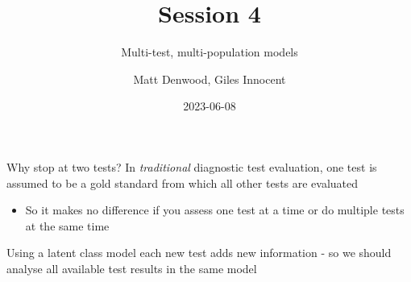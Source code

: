 \documentclass[
  ignorenonframetext,
  aspectratio=169,
]{beamer}
\title{Session 4}
\subtitle{Multi-test, multi-population models}
\author{Matt Denwood, Giles Innocent}
\date{2023-06-08}
\providecommand{\tightlist}{%
  \setlength{\itemsep}{0pt}\setlength{\parskip}{0pt}}
\begin{document}
\frame{\titlepage}

\begin{frame}{Why stop at two tests?}
\protect\hypertarget{why-stop-at-two-tests}{}
In \emph{traditional} diagnostic test evaluation, one test is assumed to
be a gold standard from which all other tests are evaluated

\begin{itemize}
\tightlist
\item
  So it makes no difference if you assess one test at a time or do
  multiple tests at the same time
\end{itemize}

\pause

Using a latent class model each new test adds new information - so we
should analyse all available test results in the same model
\end{frame}
\end{document}
